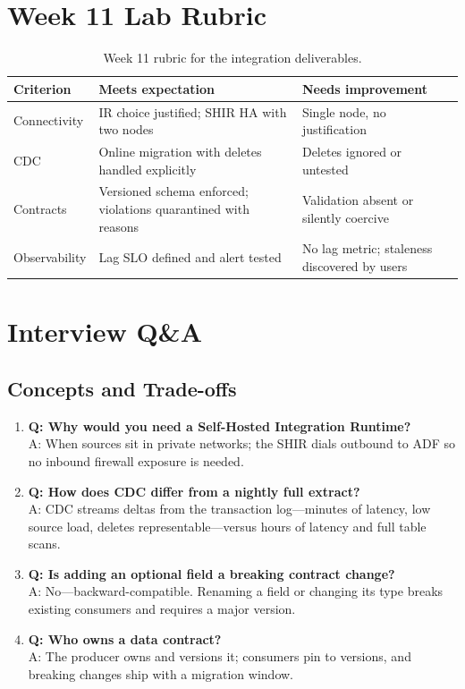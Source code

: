 \section{Week 11 Lab Rubric}
\begin{table}[H]
\centering
\small
\begin{tabular}{@{}p{3.2cm}p{5.0cm}p{5.0cm}@{}}
\toprule
\textbf{Criterion} & \textbf{Meets expectation} & \textbf{Needs improvement} \\
\midrule
Connectivity & IR choice justified; SHIR HA with two nodes & Single node, no justification \\
CDC & Online migration with deletes handled explicitly & Deletes ignored or untested \\
Contracts & Versioned schema enforced; violations quarantined with reasons & Validation absent or silently coercive \\
Observability & Lag SLO defined and alert tested & No lag metric; staleness discovered by users \\
\bottomrule
\end{tabular}
\caption{Week 11 rubric for the integration deliverables.}
\label{tab:ch11-rubric}
\end{table}

\section{Interview Q\&A}
\subsection{Concepts and Trade-offs}
\begin{enumerate}
    \item \textbf{Q: Why would you need a Self-Hosted Integration Runtime?}\\
    A: When sources sit in private networks; the SHIR dials outbound to ADF so no inbound firewall exposure is needed.
    \item \textbf{Q: How does CDC differ from a nightly full extract?}\\
    A: CDC streams deltas from the transaction log---minutes of latency, low source load, deletes representable---versus hours of latency and full table scans.
    \item \textbf{Q: Is adding an optional field a breaking contract change?}\\
    A: No---backward-compatible. Renaming a field or changing its type breaks existing consumers and requires a major version.
    \item \textbf{Q: Who owns a data contract?}\\
    A: The producer owns and versions it; consumers pin to versions, and breaking changes ship with a migration window.
\end{enumerate}

